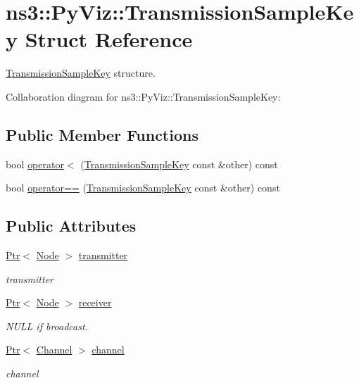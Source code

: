 \hypertarget{structns3_1_1PyViz_1_1TransmissionSampleKey}{}\section{ns3\+:\+:Py\+Viz\+:\+:Transmission\+Sample\+Key Struct Reference}
\label{structns3_1_1PyViz_1_1TransmissionSampleKey}


\hyperlink{structns3_1_1PyViz_1_1TransmissionSampleKey}{Transmission\+Sample\+Key} structure.  




Collaboration diagram for ns3\+:\+:Py\+Viz\+:\+:Transmission\+Sample\+Key\+:
\subsection*{Public Member Functions}
\begin{DoxyCompactItemize}
\item 
bool \hyperlink{structns3_1_1PyViz_1_1TransmissionSampleKey_a1d2cc305c727a04b94de725f785d1261}{operator$<$} (\hyperlink{structns3_1_1PyViz_1_1TransmissionSampleKey}{Transmission\+Sample\+Key} const \&other) const 
\item 
bool \hyperlink{structns3_1_1PyViz_1_1TransmissionSampleKey_ad1fa27292ca58f352f7bd082c0b129bf}{operator==} (\hyperlink{structns3_1_1PyViz_1_1TransmissionSampleKey}{Transmission\+Sample\+Key} const \&other) const 
\end{DoxyCompactItemize}
\subsection*{Public Attributes}
\begin{DoxyCompactItemize}
\item 
\hyperlink{classns3_1_1Ptr}{Ptr}$<$ \hyperlink{classns3_1_1Node}{Node} $>$ \hyperlink{structns3_1_1PyViz_1_1TransmissionSampleKey_a97e1eb5e6a2e1cc5fa7abe5a0ef9d5ce}{transmitter}
\begin{DoxyCompactList}\small\item\em transmitter \end{DoxyCompactList}\item 
\hyperlink{classns3_1_1Ptr}{Ptr}$<$ \hyperlink{classns3_1_1Node}{Node} $>$ \hyperlink{structns3_1_1PyViz_1_1TransmissionSampleKey_af9298992f72fa59f8f35f58c61f38afd}{receiver}
\begin{DoxyCompactList}\small\item\em N\+U\+LL if broadcast. \end{DoxyCompactList}\item 
\hyperlink{classns3_1_1Ptr}{Ptr}$<$ \hyperlink{classns3_1_1Channel}{Channel} $>$ \hyperlink{structns3_1_1PyViz_1_1TransmissionSampleKey_a51eed101c9334bd83ab2131944693f62}{channel}
\begin{DoxyCompactList}\small\item\em channel \end{DoxyCompactList}\end{DoxyCompactItemize}


